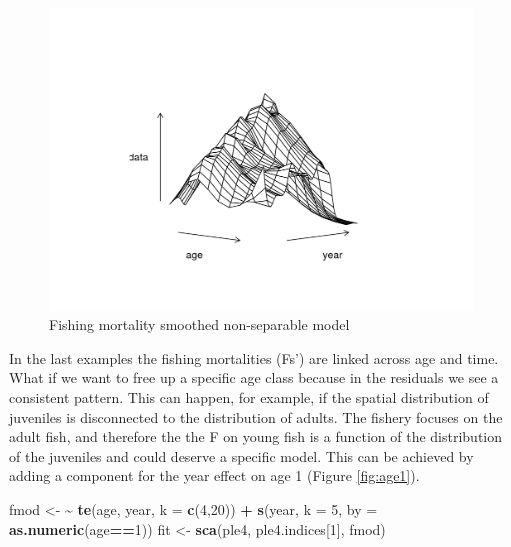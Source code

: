 \documentclass[
]{book}
\newenvironment{Shaded}{\begin{snugshade}}{\end{snugshade}}
\newcommand{\AttributeTok}[1]{\textcolor[rgb]{0.13,0.29,0.53}{#1}}
\newcommand{\DecValTok}[1]{\textcolor[rgb]{0.00,0.00,0.81}{#1}}
\newcommand{\ErrorTok}[1]{\textcolor[rgb]{0.64,0.00,0.00}{\textbf{#1}}}
\newcommand{\FunctionTok}[1]{\textcolor[rgb]{0.13,0.29,0.53}{\textbf{#1}}}
\newcommand{\NormalTok}[1]{#1}
\newcommand{\OtherTok}[1]{\textcolor[rgb]{0.56,0.35,0.01}{#1}}
\newcommand{\SpecialCharTok}[1]{\textcolor[rgb]{0.81,0.36,0.00}{\textbf{#1}}}
\begin{document}
\begin{figure}
\centering
\includegraphics{_bookdown_files/_main_files/figure-html/te1-1.png}
\caption{\label{fig:te1}Fishing mortality smoothed non-separable model}
\end{figure}

In the last examples the fishing mortalities (Fs') are linked across age and time. What if we want to free up a specific age class because in the residuals we see a consistent pattern. This can happen, for example, if the spatial distribution of juveniles is disconnected to the distribution of adults. The fishery focuses on the adult fish, and therefore the the F on young fish is a function of the distribution of the juveniles and could deserve a specific model. This can be achieved by adding a component for the year effect on age 1 (Figure \ref{fig:age1}).

\begin{Shaded}
\begin{Highlighting}[]
\NormalTok{fmod }\OtherTok{\textless{}{-}} \ErrorTok{\textasciitilde{}} \FunctionTok{te}\NormalTok{(age, year, }\AttributeTok{k =} \FunctionTok{c}\NormalTok{(}\DecValTok{4}\NormalTok{,}\DecValTok{20}\NormalTok{)) }\SpecialCharTok{+} \FunctionTok{s}\NormalTok{(year, }\AttributeTok{k =} \DecValTok{5}\NormalTok{, }\AttributeTok{by =} \FunctionTok{as.numeric}\NormalTok{(age}\SpecialCharTok{==}\DecValTok{1}\NormalTok{))}
\NormalTok{fit }\OtherTok{\textless{}{-}} \FunctionTok{sca}\NormalTok{(ple4, ple4.indices[}\DecValTok{1}\NormalTok{], fmod)}
\end{Highlighting}
\end{Shaded}
\end{document}
